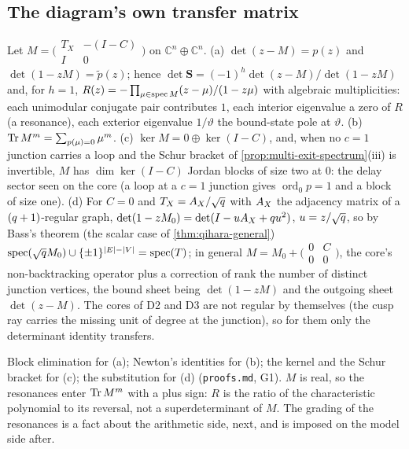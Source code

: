 \subsection{The diagram's own transfer matrix}

\begin{theorem}
\label{thm:diagram-linearisation}
Let $M = \big(\begin{smallmatrix}T_X & -(I-C)\\ I & 0\end{smallmatrix}\big)$ on $\mathbb C^n\oplus\mathbb C^n$.
(a) $\det(z-M) = p(z)$ and $\det(1-zM) = \tilde p(z)$; hence $\det\mathbf S = (-1)^h\det(z-M)/\det(1-zM)$ and, for
$h = 1$, $R(z) = -\prod_{\mu\in\operatorname{spec}M}(z-\mu)/(1-z\mu)$ with algebraic multiplicities: each
unimodular conjugate pair contributes $1$, each interior eigenvalue a zero of $R$ (a resonance), each exterior
eigenvalue $1/\vartheta$ the bound-state pole at $\vartheta$. (b) $\operatorname{Tr} M^m = \sum_{p(\mu)=0}\mu^m$. (c) $\ker M =
0\oplus\ker(I-C)$, and, when no $c = 1$ junction carries a loop and the Schur bracket of
\cref{prop:multi-exit-spectrum}(iii) is invertible, $M$ has $\dim\ker(I-C)$ Jordan blocks of size two at $0$: the
delay sector seen on the core (a loop at a $c = 1$ junction gives $\operatorname{ord}_0p = 1$ and a block of size one). (d) For $C = 0$ and
$T_X = A_X/\sqrt{q}$ with $A_X$ the adjacency matrix of a $(q+1)$-regular graph, $\det(1-zM_0) = \det(I-uA_X+qu^2)$, $u = z/\sqrt{q}$, so by Bass's theorem
(the scalar case of \cref{thm:qihara-general}) $\operatorname{spec}(\sqrt{q}M_0)\cup\{\pm1\}^{|E|-|V|} =
\operatorname{spec}(T)$; in general $M = M_0 + \big(\begin{smallmatrix}0&C\\0&0\end{smallmatrix}\big)$, the core's
non-backtracking operator plus a correction of rank the number of distinct junction vertices, the bound sheet
being $\det(1-zM)$ and the outgoing sheet $\det(z-M)$. The cores of D2 and D3 are not regular by themselves (the
cusp ray carries the missing unit of degree at the junction), so for them only the determinant identity transfers.
\end{theorem}

Block elimination for (a); Newton's identities for (b); the kernel and the Schur bracket for (c); the
substitution for (d) (\texttt{proofs.md}, G1). $M$ is real, so the resonances enter $\operatorname{Tr} M^m$ with a plus
sign: $R$ is the ratio of the characteristic polynomial to its reversal, not a superdeterminant of $M$. The
grading of the resonances is a fact about the arithmetic side, next, and is imposed on the model side after.

